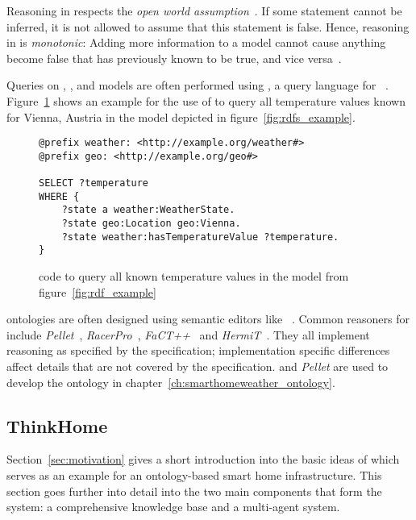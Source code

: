 Reasoning in  respects the \emph{open world assumption}~\cite{open_world_assumption1,open_world_assumption2}. If some statement cannot be inferred, it is not allowed to assume that this statement is false. Hence, reasoning in  is \emph{monotonic}: Adding more information to a model cannot cause anything become false that has previously known to be true, and vice versa~\cite{MonotonicReasoning}.

Queries on , , and  models are often performed using , a query language for ~\cite{SPARQL}. Figure~\ref{fig:sparql_example} shows an example for the use of  to query all temperature values known for Vienna, Austria in the  model depicted in figure~\ref{fig:rdfs_example}.

\begin{figure}
\begin{lstlisting}
@prefix weather: <http://example.org/weather#>
@prefix geo: <http://example.org/geo#>

SELECT ?temperature
WHERE {
    ?state a weather:WeatherState.
    ?state geo:Location geo:Vienna.
    ?state weather:hasTemperatureValue ?temperature.
}
\end{lstlisting}
\caption{ code to query all known temperature values in the model from figure~\ref{fig:rdf_example}}
\label{fig:sparql_example}
\end{figure}

 ontologies are often designed using semantic editors like \protege~\cite{protege}. Common reasoners for  include \emph{Pellet}~\cite{pellet}, \emph{RacerPro}~\cite{RacerPro}, \emph{FaCT++}~\cite{factplusplus} and \emph{HermiT}~\cite{hermit}. They all implement reasoning as specified by the  specification; implementation specific differences affect details that are not covered by the  specification. \protege and \emph{Pellet} are used to develop the \smarthomeweather ontology in chapter~\ref{ch:smarthomeweather_ontology}.

\subsection{ThinkHome}

Section~\ref{sec:motivation} gives a short introduction into the basic ideas of \thinkhome which serves as an example for an ontology-based smart home infrastructure. This section goes further into detail into the two main components that form the \thinkhome system: a comprehensive knowledge base and a multi-agent system.

